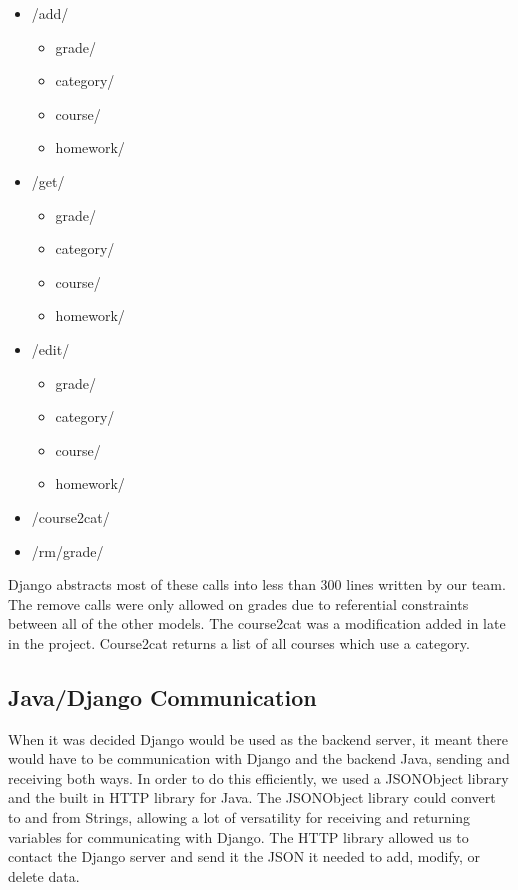 \documentclass[a4paper]{article} %
\begin{document}
\begin{itemize}
  \item /add/%
    \begin{itemize}
      \item grade/
        \item category/
        \item course/
        \item homework/
    \end{itemize}
    \item /get/%
    \begin{itemize}
      \item grade/
        \item category/
        \item course/
        \item homework/
    \end{itemize}
    \item /edit/%
    \begin{itemize}
      \item grade/
        \item category/
        \item course/
        \item homework/
    \end{itemize}
    \item /course2cat/
    \item /rm/grade/
\end{itemize}

Django abstracts most of these calls into less than 300 lines written by our team. The remove calls were only allowed on grades due to referential constraints between all of the other models. The course2cat was a modification added in late in the project. Course2cat returns a list of all courses which use a category.

\subsection{Java/Django Communication}

When it was decided Django would be used as the backend server, it meant there would have to be communication with Django and the backend Java, sending and receiving both ways. In order to do this efficiently, we used a JSONObject library and the built in HTTP library for Java. The JSONObject library could convert to and from Strings, allowing a lot of versatility for receiving and returning variables for communicating with Django. The HTTP library allowed us to contact the Django server and send it the JSON it needed to add, modify, or delete data. 
\end{document}
